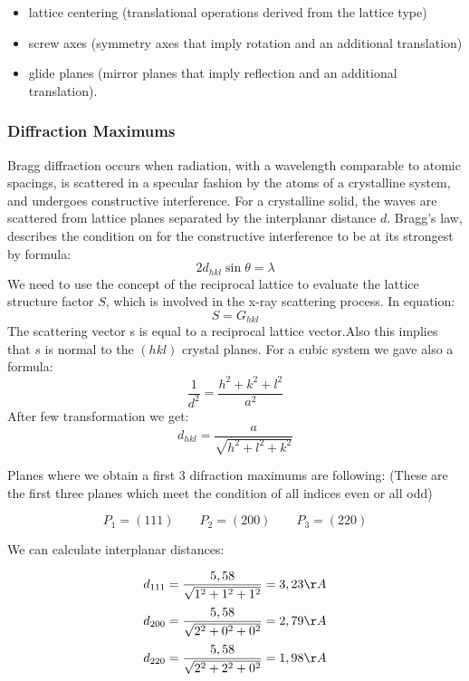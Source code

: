 \begin{itemize}
\item lattice centering (translational operations derived from the lattice type)
\item screw axes (symmetry axes that imply rotation and an additional translation)
\item glide planes (mirror planes that imply reflection and an additional translation).
\end{itemize}


\subsubsection*{Diffraction Maximums}
Bragg diffraction occurs when radiation, with a wavelength comparable to atomic 
spacings, is scattered in a specular fashion by the atoms of a crystalline system, and 
undergoes constructive interference. For a crystalline solid, the waves are scattered 
from lattice planes separated by the interplanar distance $d$. Bragg's law,  describes 
the condition on for the constructive interference to be at its strongest by formula:
\begin{equation}
\label{Bragg}
2d_{hkl} \sin{\theta} =  \lambda
\end{equation}
We need to use the concept of the reciprocal lattice to evaluate the lattice structure
factor $S$, which is involved in the x-ray scattering process. In equation:
\begin{equation}
S = G_{hkl}
\end{equation}
The scattering vector s is equal to a
reciprocal lattice vector.Also this implies that $s$ is normal to the $(hkl)$ crystal planes. For a cubic system we gave also a formula:
\begin{equation}
\frac{1}{d^2} = \frac{h^2 + k^2 + l^2}{a^2}
\end{equation}
After few transformation we get:
$$
d_{hkl} = \frac{a}{\sqrt{h^2 + l^2 + k^2}}
$$

Planes where we obtain a first 3 difraction maximums are following: 
(These are the first three planes which meet the condition of all
indices even or all odd)

$$P_1 = (111) \qquad P_2 = (200) \qquad P_3 = ( 220) $$ 

We can calculate interplanar distances:

$$d_{111} = \frac{5,58}{\sqrt{1^2 + 1^2 + 1^2}} = 3,23 \AA$$
$$d_{200} = \frac{5,58}{\sqrt{2^2 + 0^2 + 0^2}} = 2,79 \AA$$
$$d_{220} = \frac{5,58}{\sqrt{2^2 + 2^2 + 0^2}} = 1,98 \AA$$

